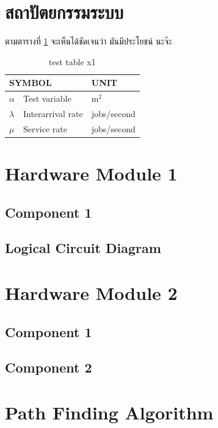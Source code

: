 \documentclass[12pt,oneside,openright,a4paper]{explo-thai-project}
\begin{document}
\section{สถาปัตยกรรมระบบ}
ตามตารางที่ \ref{tbl:symbols} จะเห็นได้ชัดเจนว่า มันมีประโยชน์ นะจ๊ะ
\begin{table}[!h]
\centering
\caption{test table x1}\label{tbl:symbols}
\begin{tabular}{@{}p{}|p{}p{}}\hline
\multicolumn{2}{l}{\textbf{SYMBOL}}  & \textbf{UNIT} \\ \hline 
$\alpha$ & Test variable\hfill & m$^2$ \\
$\lambda$ & Interarrival rate\hfill &  jobs/second\\
$\mu$ & Service rate\hfill & jobs/second \\ \hline
\end{tabular}
\end{table}



\section{Hardware Module 1}
\subsection{Component 1}
\subsection{Logical Circuit Diagram}

\section{Hardware Module 2}
\subsection{Component 1}
\subsection{Component 2}

\section{Path Finding Algorithm}
\end{document}
